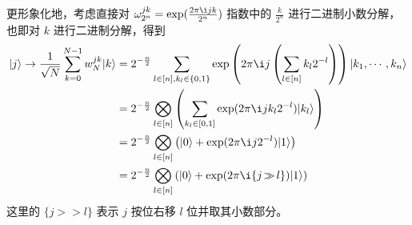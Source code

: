更形象化地，考虑直接对 $\omega_{2^n}^{jk}=\exp(\frac{2\pi\i jk}{2^n})$ 指数中的 $\frac{k}{2^n}$ 进行二进制小数分解，也即对 $k$ 进行二进制分解，得到 \begin{align*}
    \ket{j}\to\frac{1}{\sqrt{N}}\sum_{k=0}^{N-1}w_N^{jk}\ket{k}
     & =2^{-\frac{n}{2}}\sum_{l\in[n],k_l\in\{0,1\}}\exp\left(2\pi\i j\left(\sum_{l\in[n]}k_l2^{-l}\right)\right)\ket{k_1,\cdots,k_n} \\
     & =2^{-\frac{n}{2}}\bigotimes_{l\in[n]}\left(\sum_{k_l\in[0,1]}\exp(2\pi\i jk_l2^{-l})\ket{k_l}\right)                           \\
     & =2^{-\frac{n}{2}}\bigotimes_{l\in[n]}\left(\ket{0}+\exp(2\pi\i j2^{-l})\ket{1}\right)                                          \\
     & =2^{-\frac{n}{2}}\bigotimes_{l\in[n]}\left(\ket{0}+\exp(2\pi\i\{j\!>\!\!\!>\!l\})\ket{1}\right)
\end{align*}
这里的 $\{j\!>\!\!\!>\!l\}$ 表示 $j$ 按位右移 $l$ 位并取其小数部分。

\subsection{}

